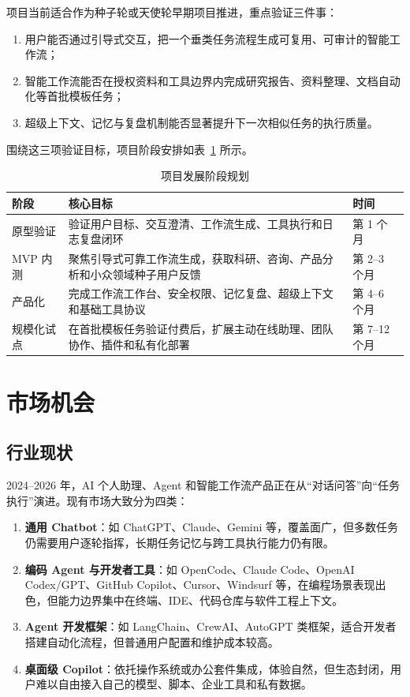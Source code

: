 \documentclass[12pt,a4paper]{ctexart}
\begin{document}
项目当前适合作为种子轮或天使轮早期项目推进，重点验证三件事：
\begin{enumerate}
  \item 用户能否通过引导式交互，把一个垂类任务流程生成可复用、可审计的智能工作流；
  \item 智能工作流能否在授权资料和工具边界内完成研究报告、资料整理、文档自动化等首批模板任务；
  \item 超级上下文、记忆与复盘机制能否显著提升下一次相似任务的执行质量。
\end{enumerate}

围绕这三项验证目标，项目阶段安排如表~\ref{tab:stages} 所示。

\begin{table}[htbp]
  \centering
  \begin{tabularx}{\textwidth}{p{3cm} X p{3cm}}
    \toprule
    \textbf{阶段} & \textbf{核心目标} & \textbf{时间} \\
    \midrule
    原型验证 & 验证用户目标、交互澄清、工作流生成、工具执行和日志复盘闭环 & 第 1 个月 \\
    MVP 内测 & 聚焦引导式可靠工作流生成，获取科研、咨询、产品分析和小众领域种子用户反馈 & 第 2--3 个月 \\
    产品化 & 完成工作流工作台、安全权限、记忆复盘、超级上下文和基础工具协议 & 第 4--6 个月 \\
    规模化试点 & 在首批模板任务验证付费后，扩展主动在线助理、团队协作、插件和私有化部署 & 第 7--12 个月 \\
    \bottomrule
  \end{tabularx}
  \caption{项目发展阶段规划}
  \label{tab:stages}
\end{table}

\section{市场机会}

\subsection{行业现状}

2024--2026 年，AI 个人助理、Agent 和智能工作流产品正在从“对话问答”向“任务执行”演进。现有市场大致分为四类：

\begin{enumerate}
  \item \textbf{通用 Chatbot}：如 ChatGPT、Claude、Gemini 等，覆盖面广，但多数任务仍需要用户逐轮指挥，长期任务记忆与跨工具执行能力仍有限。
  \item \textbf{编码 Agent 与开发者工具}：如 OpenCode、Claude Code、OpenAI Codex/GPT、GitHub Copilot、Cursor、Windsurf 等，在编程场景表现出色，但能力边界集中在终端、IDE、代码仓库与软件工程上下文。
  \item \textbf{Agent 开发框架}：如 LangChain、CrewAI、AutoGPT 类框架，适合开发者搭建自动化流程，但普通用户配置和维护成本较高。
  \item \textbf{桌面级 Copilot}：依托操作系统或办公套件集成，体验自然，但生态封闭，用户难以自由接入自己的模型、脚本、企业工具和私有数据。
\end{enumerate}
\end{document}
